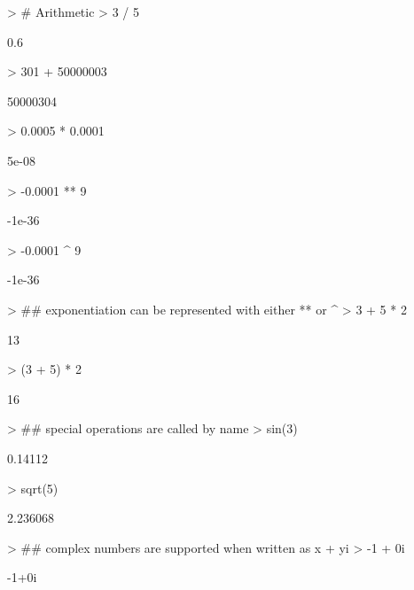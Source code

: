 \documentclass[10pt,letterpaper]{article}
\begin{document}
\begin{Schunk}
\begin{Sinput}
> # Arithmetic
> 3 / 5
\end{Sinput}
\begin{Soutput}
[1] 0.6
\end{Soutput}
\begin{Sinput}
> 301 + 50000003
\end{Sinput}
\begin{Soutput}
[1] 50000304
\end{Soutput}
\begin{Sinput}
> 0.0005 * 0.0001
\end{Sinput}
\begin{Soutput}
[1] 5e-08
\end{Soutput}
\begin{Sinput}
> -0.0001 ** 9
\end{Sinput}
\begin{Soutput}
[1] -1e-36
\end{Soutput}
\begin{Sinput}
> -0.0001 ^ 9
\end{Sinput}
\begin{Soutput}
[1] -1e-36
\end{Soutput}
\begin{Sinput}
> ## exponentiation can be represented with either ** or ^
> 3 + 5 * 2
\end{Sinput}
\begin{Soutput}
[1] 13
\end{Soutput}
\begin{Sinput}
> (3 + 5) * 2
\end{Sinput}
\begin{Soutput}
[1] 16
\end{Soutput}
\begin{Sinput}
> ## special operations are called by name
> sin(3)
\end{Sinput}
\begin{Soutput}
[1] 0.14112
\end{Soutput}
\begin{Sinput}
> sqrt(5)
\end{Sinput}
\begin{Soutput}
[1] 2.236068
\end{Soutput}
\begin{Sinput}
> ## complex numbers are supported when written as x + yi
> -1 + 0i
\end{Sinput}
\begin{Soutput}
[1] -1+0i
\end{Soutput}

\end{Schunk}
\end{document}
